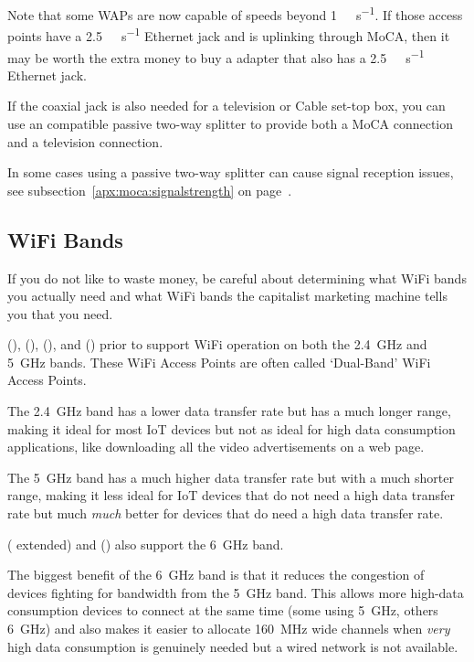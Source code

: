 Note that some WAPs are now capable of speeds beyond \qty{1}{\giga\bit\per\second}. If those access points
have a \qty{2.5}{\giga\bit\per\second} Ethernet jack and is uplinking through MoCA, then it may be worth the
extra money to buy a  adapter that also has a \qty{2.5}{\giga\bit\per\second} Ethernet jack.

If the coaxial jack is also needed for a television or Cable set-top box, you can use an \xdband{} compatible
passive two-way splitter to provide both a MoCA connection and a television connection.

In some cases using a passive two-way splitter can cause signal reception issues, see
subsection~\ref{apx:moca:signalstrength} on page~\pageref{apx:moca:signalstrength}.

\subsection{WiFi Bands}

If you do not like to waste money, be careful about determining what WiFi bands you actually need and what
WiFi bands the capitalist marketing machine tells you that you need.

 (),  (),  (), and  ()
prior to  support WiFi operation on both the \qty{2.4}{\giga\hertz} and \qty{5}{\giga\hertz} bands.
These WiFi Access Points are often called `Dual-Band' WiFi Access Points.

The \qty{2.4}{\giga\hertz} band has a lower data transfer rate but has a much longer range, making it ideal
for most IoT devices but not as ideal for high data consumption applications, like downloading all the
video advertisements on a web page.

The \qty{5}{\giga\hertz} band has a much higher data transfer rate but with a much shorter range, making it
less ideal for IoT devices that do not need a high data transfer rate but much \emph{much} better for
devices that do need a high data transfer rate.

 ( extended) and  () also support the \qty{6}{\giga\hertz} band.

The biggest benefit of the \qty{6}{\giga\hertz} band is that it reduces the congestion of devices fighting
for bandwidth from the \qty{5}{\giga\hertz} band. This allows more high-data consumption devices to connect
at the same time (some using \qty{5}{\giga\hertz}, others \qty{6}{\giga\hertz}) and also makes it easier to
allocate \qty{160}{\mega\hertz} wide channels when \emph{very} high data consumption is genuinely needed
but a wired network is not available.

